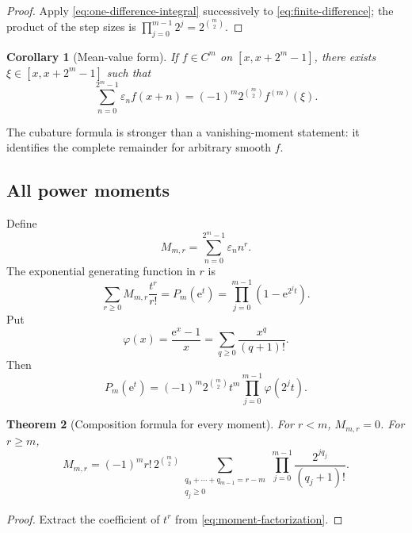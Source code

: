 \documentclass[11pt,oneside]{article}
\newtheorem{theorem}{Theorem}[section]
\newtheorem{corollary}[theorem]{Corollary}
\theoremstyle{definition}
\theoremstyle{remark}
\newcommand{\e}{\mathrm e}
\newcommand{\eps}{\varepsilon}
\begin{document}
\begin{proof}
Apply \cref{eq:one-difference-integral} successively to
\cref{eq:finite-difference}; the product of the step sizes is
$\prod_{j=0}^{m-1}2^j=2^{\binom m2}$.
\end{proof}

\begin{corollary}[Mean-value form]\label{cor:mean-value}
If $f\in C^m$ on $[x,x+2^m-1]$, there exists
$\xi\in[x,x+2^m-1]$ such that
\begin{equation}\label{eq:mean-value}
 \sum_{n=0}^{2^m-1}\eps_nf(x+n)
 =(-1)^m2^{\binom m2}f^{(m)}(\xi).
\end{equation}
\end{corollary}

The cubature formula is stronger than a vanishing-moment statement: it
identifies the complete remainder for arbitrary smooth $f$.

\subsection{All power moments}

Define
\begin{equation}\label{eq:moment-def}
 M_{m,r}=\sum_{n=0}^{2^m-1}\eps_nn^r.
\end{equation}
The exponential generating function in $r$ is
\begin{equation}\label{eq:moment-egf}
 \sum_{r\ge0}M_{m,r}\frac{t^r}{r!}
 =P_m(\e^t)
 =\prod_{j=0}^{m-1}(1-\e^{2^jt}).
\end{equation}
Put
\[
 \varphi(x)=\frac{\e^x-1}{x}=\sum_{q\ge0}\frac{x^q}{(q+1)!}.
\]
Then
\begin{equation}\label{eq:moment-factorization}
 P_m(\e^t)=(-1)^m2^{\binom m2}t^m
 \prod_{j=0}^{m-1}\varphi(2^jt).
\end{equation}

\begin{theorem}[Composition formula for every moment]\label{thm:all-moments}
For $r<m$, $M_{m,r}=0$.  For $r\ge m$,
\begin{equation}\label{eq:all-moments-composition}
 \boxed{\quad
 M_{m,r}=(-1)^m r!\,2^{\binom m2}
 \sum_{\substack{q_0+\cdots+q_{m-1}=r-m\\q_j\ge0}}
 \prod_{j=0}^{m-1}\frac{2^{jq_j}}{(q_j+1)!}.
 \quad}
\end{equation}
\end{theorem}

\begin{proof}
Extract the coefficient of $t^r$ from
\cref{eq:moment-factorization}.
\end{proof}
\end{document}
